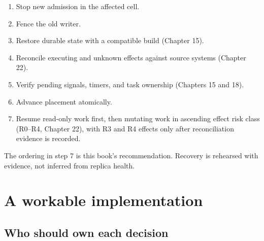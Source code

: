 \begin{enumerate}

\item Stop new admission in the affected cell.

\item Fence the old writer.

\item Restore durable state with a compatible build (Chapter 15).

\item Reconcile executing and unknown effects against source systems (Chapter 22).

\item Verify pending signals, timers, and task ownership (Chapters 15 and 18).

\item Advance placement atomically.

\item Resume read-only work first, then mutating work in ascending effect risk class (R0–R4, Chapter 22), with R3 and R4 effects only after reconciliation evidence is recorded.

\end{enumerate}

The ordering in step 7 is this book's recommendation. Recovery is rehearsed with evidence, not inferred from replica health.\par

\section{A workable implementation}

\subsection{Who should own each decision}


